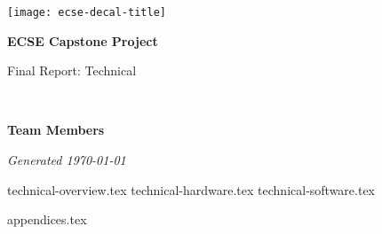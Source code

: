 \documentclass{capstone}
\begin{document}

\titlepage
	{\texttt{[image: ecse-decal-title]}}
	{
		\centering\sffamily
		{\Huge\bfseries ECSE Capstone Project\par}
		\vspace{16pt} 
		{\LARGE Final Report: Technical \par} 
		\vspace{24pt}
		{\huge\bfseries \teamname\par} %
	}


~\vfill

\noindent \textbf{Team Members}
\teammembers

\noindent \textit{Generated \today}

\tableofcontents

{technical-overview.tex}
{technical-hardware.tex}
{technical-software.tex}

\begin{appendices}
{appendices.tex}
\end{appendices}
\end{document}
